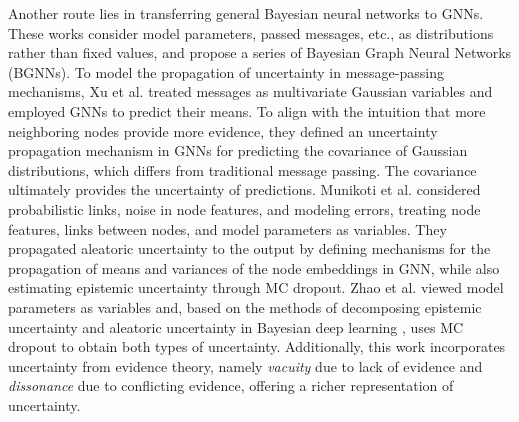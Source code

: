 Another route lies in transferring general Bayesian neural networks to GNNs. These works consider model parameters, passed messages, etc., as distributions rather than fixed values, and propose a series of Bayesian Graph Neural Networks (BGNNs).
To model the propagation of uncertainty in message-passing mechanisms, Xu et al. \cite{xu2022uncertainty} treated messages as multivariate Gaussian variables and employed GNNs to predict their means. To align with the intuition that more neighboring nodes provide more evidence, they defined an uncertainty propagation mechanism in GNNs for predicting the covariance of Gaussian distributions, which differs from traditional message passing. The covariance ultimately provides the uncertainty of predictions. 
Munikoti et al. \cite{munikoti2023general} considered probabilistic links, noise in node features, and modeling errors, treating node features, links between nodes, and model parameters as variables. They propagated aleatoric  uncertainty to the output by defining mechanisms for the propagation of means and variances of the node embeddings in GNN, while also estimating epistemic uncertainty through MC dropout. 
Zhao et al. \cite{zhao2020uncertainty} viewed model parameters as variables and, based on the methods of decomposing epistemic uncertainty and aleatoric uncertainty in Bayesian deep learning \cite{depeweg2018decomposition, malinin2018predictive}, uses MC dropout to obtain both types of uncertainty. Additionally, this work incorporates uncertainty from evidence theory, namely \textit{vacuity} due to lack of evidence and \textit{dissonance} due to conflicting evidence, offering a richer representation of uncertainty.


